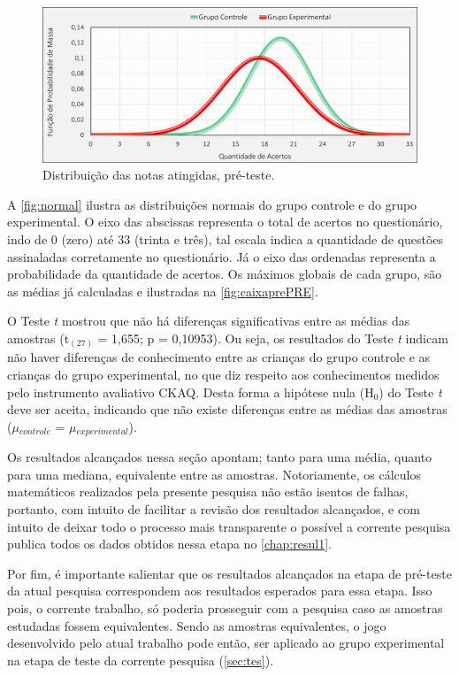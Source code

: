 \begin{figure}[htb]
    \centering
    \caption{\label{fig:normal}Distribuição das notas atingidas, pré-teste.}
    \includegraphics[width=\linewidth]{./Visuais/Graficos1.pdf}
  
\end{figure}

A \autoref{fig:normal} ilustra as distribuições normais do grupo controle e do grupo experimental. O eixo das abscissas representa o total de acertos no questionário, indo de 0 (zero) até 33 (trinta e três), tal escala indica a quantidade de questões assinaladas corretamente no questionário. Já o eixo das ordenadas representa a probabilidade da quantidade de acertos. Os máximos globais de cada grupo, são as médias já calculadas e ilustradas na \autoref{fig:caixaprePRE}.

O Teste \textit{t} mostrou que não há diferenças significativas entre as médias das amostras (t$_{(27)}$ = 1,655; p = 0,10953). Ou seja, os resultados do Teste \textit{t} indicam não haver diferenças de conhecimento entre as crianças do grupo controle e as crianças do grupo experimental, no que diz respeito aos conhecimentos medidos pelo instrumento avaliativo \ac{CKAQ}. Desta forma a hipótese nula (H$_0$) do Teste \textit{t} deve ser aceita, indicando que não existe diferenças entre as médias das amostras ($\mu$$_{controle}$ = $\mu$$_{experimental}$). 

Os resultados alcançados nessa seção apontam; tanto para uma média, quanto para uma mediana, equivalente entre as amostras. Notoriamente, os cálculos matemáticos realizados pela presente pesquisa não estão isentos de falhas, portanto, com intuito de facilitar a revisão dos resultados alcançados, e com intuito de deixar todo o processo mais transparente o possível a corrente pesquisa publica todos os dados obtidos nessa etapa no \autoref{chap:resul1}.

Por fim, é importante salientar que os resultados alcançados na etapa de pré-teste da atual pesquisa correspondem aos resultados esperados para essa etapa. Isso pois, o corrente trabalho, só poderia prosseguir com a pesquisa caso as amostras estudadas fossem equivalentes. Sendo as amostras equivalentes, o jogo desenvolvido pelo atual trabalho pode então, ser aplicado ao grupo experimental na etapa de teste da corrente pesquisa (\autoref{sec:tes}).


